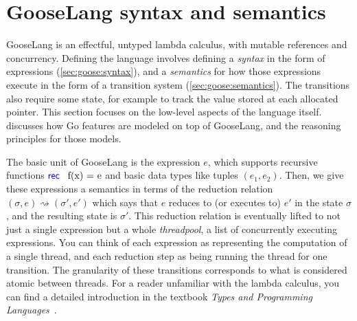 \section{GooseLang syntax and semantics}%
\label{sec:goose:lang}

\newcommand{\goosedef}[1]{\mathsf{#1}}
\newcommand{\goosekw}[1]{\ensuremath{\goosedef{\textcolor{blue}{#1}}}}
\newcommand{\app}{\:}
\newcommand{\binop}{\circledcirc}
\newcommand{\unop}{\circleddash}

\newcommand{\external}{\mathsf{\textcolor{red}{\langle External \rangle}}}

\newcommand{\goosetrue}{\goosekw{true}}
\newcommand{\goosefalse}{\goosekw{false}}

\newcommand{\gooseif}[3]{\goosekw{if} \app #1 \app%
  \goosekw{then} \app #2 \app \goosekw{else} \app #3}

\newcommand{\recfx}{\mbox{\goosekw{rec} \, f(x) = e}}
\newcommand{\gooselambda}[1]{\goosekw{\lambda}#1.\,}

\newcommand{\reduces}{\rightsquigarrow}
\newcommand{\purereduction}{\overset{\mathrm{pure}}{\reduces}}

\newcommand{\seq}{;\,}
\newcommand{\defeq}{\triangleq}

GooseLang is an effectful, untyped lambda calculus, with mutable references and
concurrency. Defining the language involves defining a \emph{syntax} in the form
of expressions (\cref{sec:goose:syntax}), and a \emph{semantics} for how those expressions execute in the
form of a transition system (\cref{sec:goose:semantics}). The transitions also require some state, for
example to track the value stored at each allocated pointer. This section
focuses on the low-level aspects of the language itself.
 discusses how Go features are modeled on top of
GooseLang, and the reasoning principles for those models.

The basic unit of GooseLang is the expression $e$, which supports recursive
functions $\recfx$ and basic data types like tuples $(e_1, e_2)$. Then, we give
these expressions a semantics in terms of the reduction relation
$(\sigma, e) \reduces (\sigma', e')$ which says that $e$ reduces to (or executes
to) $e'$ in the state $\sigma$, and the resulting state is $\sigma'$. This
reduction relation is eventually lifted to not just a single expression but a
whole \emph{threadpool}, a list of concurrently executing expressions. You
can think of each expression as representing the computation of a single thread,
and each reduction step as being running the thread for one transition. The
granularity of these transitions corresponds to what is considered atomic
between threads. For a reader unfamiliar with the lambda calculus, you can find
a detailed introduction in the textbook \emph{Types and Programming
Languages}~\cite[Chapter~5]{pierce:tapl}.


